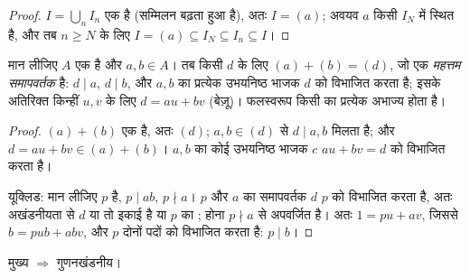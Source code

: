 \begin{proof}
$I = \bigcup_n I_n$ एक  है (सम्मिलन बढ़ता हुआ है), अतः $I =
(a)$; अवयव $a$
किसी $I_N$ में स्थित है, और तब $n \geq N$ के लिए $I = (a)
\subseteq I_N \subseteq I_n \subseteq I$।
\end{proof}

\begin{lemma}[बेज़ू; यूक्लिड की प्रमेयिका]\label{lem:b3:rings:bezout}
मान लीजिए $A$ एक  है और $a, b \in A$। तब किसी $d$ के लिए $(a) + (b) = (d)$,
जो एक \emph{महत्तम समापवर्तक} है:
$d \mid a$, $d \mid b$, और $a,
b$ का प्रत्येक उभयनिष्ठ भाजक $d$ को
विभाजित करता है; इसके अतिरिक्त किन्हीं $u, v$ के लिए $d = au + bv$
(बेज़ू)। फलस्वरूप किसी  का प्रत्येक  अभाज्य होता
है।
\end{lemma}

\begin{proof}
$(a) + (b)$ एक  है, अतः $(d)$; $a, b \in (d)$ से $d \mid
a, b$ मिलता है; और $d = au + bv \in (a) + (b)$।
$a, b$ का कोई उभयनिष्ठ भाजक $c$ $au + bv = d$ को विभाजित करता है।

यूक्लिड: मान लीजिए $p$  है, $p \mid ab$, $p \nmid a$। $p$ और
$a$ का  समापवर्तक $d$ $p$ को विभाजित करता है, अतः
अखंडनीयता से $d$ या तो इकाई है या $p$ का ;  होना
$p \nmid a$ से अपवर्जित है। अतः $1 = pu + av$, जिससे $b = pub + abv$, और $p$ दोनों
पदों को विभाजित करता है: $p \mid b$।
\end{proof}

\begin{theorem}\label{thm:b3:rings:pidufd}
मुख्य $\Rightarrow$ गुणनखंडनीय।
\end{theorem}

